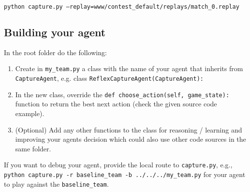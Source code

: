 \documentclass[11pt]{article}
\begin{document}
\texttt{python capture.py --replay=www/contest\_default/replays/match\_0.replay}

\subsection{Building your agent}
In the root folder do the following:

\begin{enumerate}
    \item Create in \texttt{my\_team.py} a class with the name of your agent that inherits from \texttt{CaptureAgent}, e.g. class \texttt{ReflexCaptureAgent(CaptureAgent):}
    \item In the new class, override the \texttt{def choose\_action(self, game\_state):} function to return the best next action (check the given source code example).
    \item (Optional) Add any other functions to the class for reasoning / learning and improving your agents decision which could also use other code sources in the same folder.
\end{enumerate}

If you want to debug your agent, provide the local route to \texttt{capture.py}, e.g., \texttt{python capture.py -r baseline\_team -b ../../../my\_team.py} for your agent to play against the \texttt{baseline\_team}.

\newpage
\end{document}
